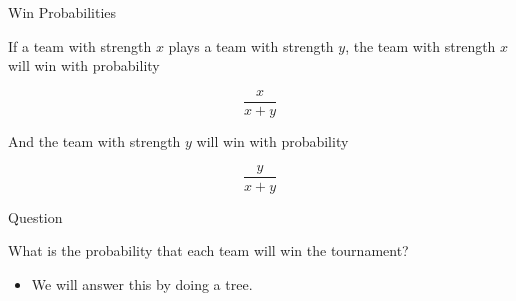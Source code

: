 \documentclass[
  ignorenonframetext,
]{beamer}
\providecommand{\tightlist}{%
  \setlength{\itemsep}{0pt}\setlength{\parskip}{0pt}}
\renewcommand{\,}{\text{, }}
\begin{document}
\begin{frame}{Win Probabilities}
\protect\hypertarget{win-probabilities-1}{}

If a team with strength \(x\) plays a team with strength \(y\), the team
with strength \(x\) will win with probability

\[
\frac{x}{x+ y}
\]

\bigskip

And the team with strength \(y\) will win with probability

\[
\frac{y}{x + y}
\]

\end{frame}

\begin{frame}{Question}
\protect\hypertarget{question}{}

What is the probability that each team will win the tournament?

\begin{itemize}[<+->]
\tightlist
\item
  We will answer this by doing a tree.
\end{itemize}

\end{frame}
\end{document}
